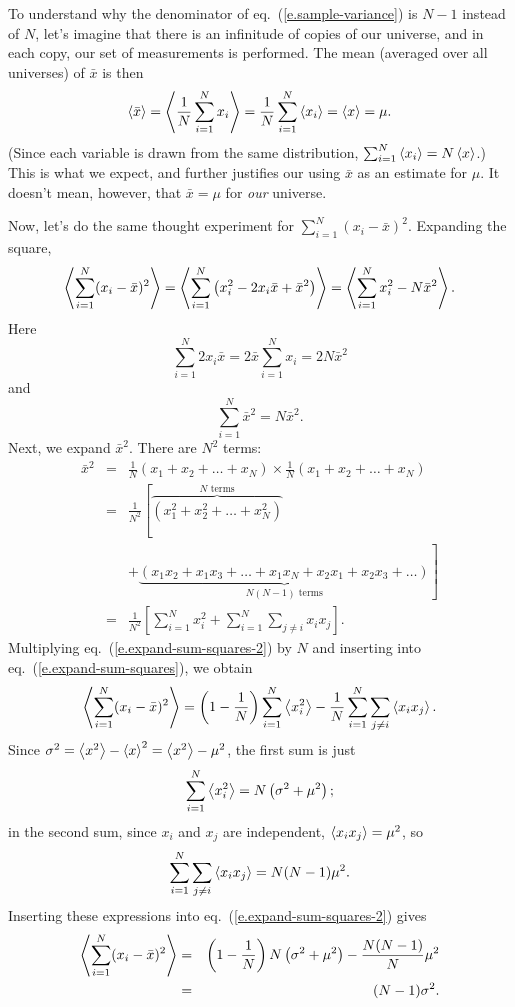 \begin{sidebar}
To understand why the denominator of eq.~(\ref{e.sample-variance}) is $N-1$ instead of $N$, let's imagine that there is an infinitude of copies of our universe, and in each copy, our set of measurements is performed. The mean (averaged over all universes) of $\bar{x}$ is then
\[
\left\langle\bar{x}\right\rangle = \left\langle\frac{1}{N}\sum_{i=1}^{N}x_{i}\right\rangle = \frac{1}{N}\sum_{i=1}^{N}\left\langle x_{i}\right\rangle = \left\langle x\right\rangle = \mu.
\]
(Since each variable is drawn from the same distribution, $\sum_{i=1}^{N}\left\langle x_{i}\right\rangle = N\left\langle x\right\rangle$.)
This is what we expect, and further justifies our using $\bar{x}$ as an estimate for $\mu$. It doesn't mean, however, that $\bar{x} = \mu$ for \emph{our} universe.

Now, let's do the same thought experiment for $\sum_{i=1}^{N}(x_{i}-\bar{x})^{2}$. Expanding the square,
\begin{equation}\label{e.expand-sum-squares}
\left\langle\sum_{i=1}^{N}(x_{i}-\bar{x})^{2}\right\rangle = \left\langle\sum_{i=1}^{N}\left(x_{i}^{2} - 2 x_{i}\bar{x} + \bar{x}^{2}\right)\right\rangle = \left\langle\sum_{i=1}^{N}x_{i}^{2} - N\bar{x}^{2}\right\rangle.
\end{equation}
Here \[\sum_{i=1}^{N}2x_{i}\bar{x} = 2\bar{x}\sum_{i=1}^{N}x_{i} = 2N\bar{x}^{2} \] and \[ \sum_{i=1}^{N}\bar{x}^{2} = N\bar{x}^{2}.\]
Next, we expand $\bar{x}^{2}$. There are $N^{2}$ terms: 
\begin{eqnarray}
\nonumber
	\bar{x}^{2} &=& \frac{1}{N} (x_{1}+x_{2}+\ldots+x_{N})\times\frac{1}{N}(x_{1}+x_{2}+\ldots+x_{N})\\
\nonumber
		&=& \frac{1}{N^{2}} \left[\overbrace{\left(x_{1}^{2}+x_{2}^{2}+\ldots+x_{N}^{2}\right)}^{\textrm{$N$ terms}}\right. \\
\nonumber
		&& + \left.\underbrace{\left(x_{1}x_{2}+x_{1}x_{3} + \ldots + x_{1}x_{N} + x_{2}x_{1} + x_{2}x_{3} + \ldots\right)}_{\textrm{$N(N-1)$ terms}}\right]\\
		&=& \frac{1}{N^{2}}\left[\sum_{i=1}^{N}x_{i}^{2} + \sum_{i=1}^{N}\sum_{j\neq i}x_{i}x_{j}\right].
\label{e.expand-sum-squares-2}
\end{eqnarray}
Multiplying eq.~(\ref{e.expand-sum-squares-2}) by $N$ and inserting into eq.~(\ref{e.expand-sum-squares}), we obtain
\[
\left\langle\sum_{i=1}^{N}(x_{i}-\bar{x})^{2}\right\rangle = \left(1-\frac{1}{N}\right)\sum_{i=1}^{N} \left\langle x_{i}^{2}\right\rangle - \frac{1}{N} \sum_{i=1}^{N}\sum_{j\neq i}\left\langle x_{i}x_{j}\right\rangle.
\]
Since $\sigma^{2} = \left\langle x^{2}\right\rangle-\left\langle x\right\rangle^{2} = \left\langle x^{2}\right\rangle-\mu^{2}$, the first sum is just
\[
\sum_{i=1}^{N}\left\langle x_{i}^{2}\right\rangle = N\left(\sigma^{2} + \mu^{2}\right);
\]
in the second sum, since $x_{i}$ and $x_{j}$ are independent, $\left\langle x_{i}x_{j}\right\rangle = \mu^{2}$, so
\[
\sum_{i=1}^{N}\sum_{j\neq i}\left\langle x_{i}x_{j}\right\rangle = N(N-1)\mu^{2}.
\]
Inserting these expressions into eq.~(\ref{e.expand-sum-squares-2}) gives
\begin{eqnarray*}
\left\langle\sum_{i=1}^{N}(x_{i}-\bar{x})^{2}\right\rangle &=& \left(1-\frac{1}{N}\right)N\left(\sigma^{2} + \mu^{2}\right) - \frac{N(N-1)}{N}\mu^{2} \\
	&=& (N-1)\sigma^{2}.
\end{eqnarray*}
\end{sidebar}

